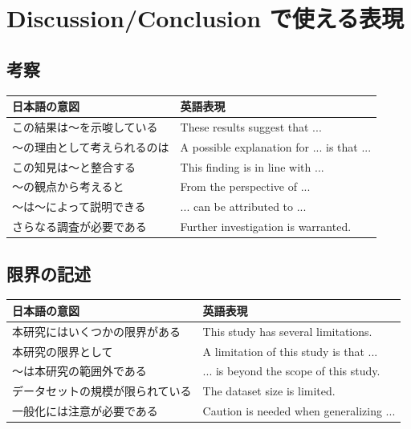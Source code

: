 \section{Discussion/Conclusion で使える表現}

\subsection*{考察}

\begin{table}[H]
\centering
\small
\begin{tabular}{p{4cm}p{6cm}}
\toprule
日本語の意図 & 英語表現 \\
\midrule
この結果は〜を示唆している & These results suggest that ... \\
〜の理由として考えられるのは & A possible explanation for ... is that ... \\
この知見は〜と整合する & This finding is in line with ... \\
〜の観点から考えると & From the perspective of ... \\
〜は〜によって説明できる & ... can be attributed to ... \\
さらなる調査が必要である & Further investigation is warranted. \\
\bottomrule
\end{tabular}
\end{table}

\subsection*{限界の記述}

\begin{table}[H]
\centering
\small
\begin{tabular}{p{4cm}p{6cm}}
\toprule
日本語の意図 & 英語表現 \\
\midrule
本研究にはいくつかの限界がある & This study has several limitations. \\
本研究の限界として & A limitation of this study is that ... \\
〜は本研究の範囲外である & ... is beyond the scope of this study. \\
データセットの規模が限られている & The dataset size is limited. \\
一般化には注意が必要である & Caution is needed when generalizing ... \\
\bottomrule
\end{tabular}
\end{table}

